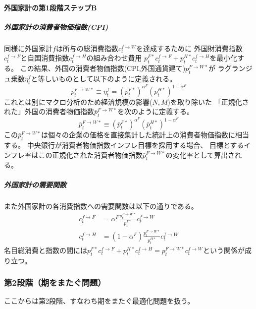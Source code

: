 \paragraph{外国家計の第1段階ステップB}
\label{sec:model_households_indices_aggregation_stage1b_foreign}

\subparagraph{外国家計の消費者物価指数(CPI)}
同様に外国家計\(f\)は所与の総消費指数\(c_t^{f\to W}\)を達成するために
外国財消費指数\(c_t^{f\to F}\)と自国消費指数\(c_t^{f\to H}\)の組み合わせ費用
\(p_t^{F*}c_t^{f\to F}+p_t^{H*}c_t^{f\to H}\)を最小化する。
この結果、外国の消費者物価指数(CPI,外国通貨建て)\(p_t^{F\to W*}\)が
ラグランジュ乗数\(\eta_t^f\)と等しいものとして以下のように定義される。
\begin{equation}
\label{form:model_households_indices_aggregation_stage1b_foreign_p_F_W_star_def}
    p_t^{F\to W*}\equiv\eta_t^f=(p_t^{F*})^{\alpha^F}(p_t^{H*})^{1-\alpha^F}
\end{equation}
これとは別にマクロ分析のため経済規模の影響(\(N,M\))を取り除いた
「正規化された」外国の消費者物価指数\(\bar{p}_t^{F\to W*}\)を次のように定義する。
\begin{equation}
\label{form:model_households_indices_aggregation_stage1b_foreign_p_F_W_star_bar_def}
    \bar{p}_t^{F\to W*}\equiv(\bar{p}_t^{F*})^{\alpha^F}(\bar{p}_t^{H*})^{1-\alpha^F}
\end{equation}
この\(\bar{p}_t^{F\to W*}\)は個々の企業の価格を直接集計した統計上の消費者物価指数に相当する。
中央銀行が消費者物価指数インフレ目標を採用する場合、
目標とするインフレ率はこの正規化された消費者物価指数\(\bar{p}_t^{F\to W*}\)の変化率として算出される。

\subparagraph{外国家計の需要関数}
また外国家計の各消費指数への需要関数は以下の通りである。
\begin{align}
    \label{form:model_households_indices_aggregation_stage1b_foreign_c_f_F_eq}
        c_t^{f\to F}&=\alpha^F\frac{p_t^{F\to W*}}{p_t^{F*}}c_t^{f\to W} \\
    \label{form:model_households_indices_aggregation_stage1b_foreign_c_f_H_eq}
        c_t^{f\to H}&=(1-\alpha^F) \frac{p_t^{F\to W*}}{p_t^{H*}}c_t^{f\to W}
\end{align}
名目総消費と指数の間には\(p_t^{F*}c_t^{f\to F}+p_t^{H*}c_t^{f\to H}=p_t^{F\to W*}c_t^{f\to W}\)という関係が成り立つ。

\subsubsection{第2段階（期をまたぐ問題）}
\label{sec:model_households_indices_aggregation_stage2}
ここからは第2段階、すなわち期をまたぐ最適化問題を扱う。

